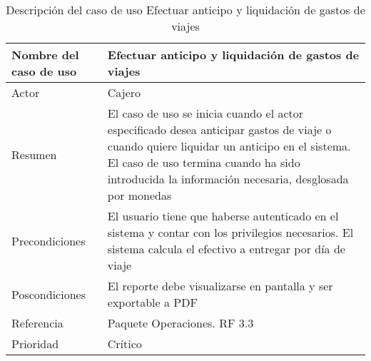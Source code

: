 \begin{table}[H]
	\sf
	\begin{supertabular}{|p{4.5cm}|p{12cm}|}
		\hline
		\textbf{Nombre del caso de uso}
		& \textbf{Efectuar anticipo y liquidación de gastos de viajes} \\ \hline
		
		Actor
		& Cajero \\ \hline
		
		Resumen
		& El caso de uso se inicia cuando el actor especificado desea anticipar gastos de viaje o cuando quiere liquidar un anticipo en el sistema. El caso de uso termina cuando ha sido introducida la información necesaria, desglosada por monedas \\ \hline
		
		Precondiciones
		& El usuario tiene que haberse autenticado en el sistema y contar con los privilegios necesarios. El sistema calcula el efectivo a entregar por día de viaje \\ \hline
		
		Poscondiciones
		& El reporte debe visualizarse en pantalla y ser exportable a PDF \\ \hline
		
		Referencia
		& Paquete Operaciones. RF 3.3 \\ \hline
		
		Prioridad
		& Crítico \\		
		\hline
	\end{supertabular}
	\caption[Descripción del caso de uso Efectuar anticipo y liquidación de gastos de viajes]{Descripción del caso de uso Efectuar anticipo y liquidación de gastos de viajes}
	\label{table:CU_EfectAntic}
\end{table}

